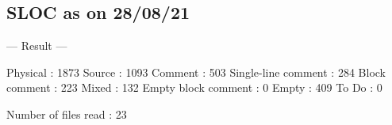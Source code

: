 \subsection*{S\+L\+OC as on 28/08/21}

--- Result --- 
\begin{DoxyCode}
            Physical :  1873
              Source :  1093
             Comment :  503
 Single-line comment :  284
       Block comment :  223
               Mixed :  132
 Empty block comment :  0
               Empty :  409
               To Do :  0

Number of files read :  23
\end{DoxyCode}


 